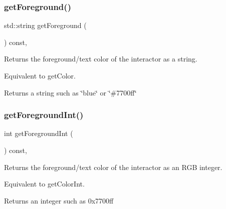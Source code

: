 \mbox{\label{classsgl_1_1GInteractor_a4fa2d8b0192a3a5b4af4bbfe71194d03}} 
\subsubsection{\texorpdfstring{get\+Foreground()}{getForeground()}}
{\footnotesize\ttfamily std\+::string get\+Foreground (\begin{DoxyParamCaption}{ }\end{DoxyParamCaption}) const\hspace{0.3cm}{\ttfamily [virtual]}, {\ttfamily [inherited]}}



Returns the foreground/text color of the interactor as a string. 

Equivalent to get\+Color. \begin{DoxyReturn}{Returns}
a string such as \char`\"{}blue\char`\"{} or \char`\"{}\#7700ff\char`\"{} 
\end{DoxyReturn}
\mbox{\label{classsgl_1_1GInteractor_ac3b12ab385a6ef9ae90fc879860ba726}} 
\subsubsection{\texorpdfstring{get\+Foreground\+Int()}{getForegroundInt()}}
{\footnotesize\ttfamily int get\+Foreground\+Int (\begin{DoxyParamCaption}{ }\end{DoxyParamCaption}) const\hspace{0.3cm}{\ttfamily [virtual]}, {\ttfamily [inherited]}}



Returns the foreground/text color of the interactor as an R\+GB integer. 

Equivalent to get\+Color\+Int. \begin{DoxyReturn}{Returns}
an integer such as 0x7700ff 
\end{DoxyReturn}
\mbox{\label{classsgl_1_1GInteractor_a1e7e353362434072875264cf95629f99}} 
